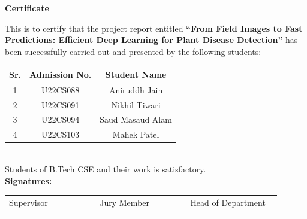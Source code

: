 \documentclass[12pt, a4paper]{report}
\begin{document}
\newpage
\thispagestyle{empty}

\begin{center}
    \vspace*{1in} %
    
    {\LARGE \textbf{Certificate}} \\[1.2cm]

    \begin{minipage}{0.9\textwidth}
        \normalsize
        This is to certify that the project report entitled \textbf{\normalsize ``From Field Images to Fast Predictions: Efficient Deep Learning for Plant Disease Detection''} has been successfully carried out and presented by the following students: \\[0.8cm]

        \renewcommand{\arraystretch}{1.2}
        \begin{tabular}{|c|c|c|}
            \hline
            \textbf{Sr.} & \textbf{Admission No.} & \textbf{Student Name} \\
            \hline
            1 & U22CS088 & Aniruddh Jain \\
            \hline
            2 & U22CS091 & Nikhil Tiwari \\
            \hline
            3 & U22CS094 & Saud Masaud Alam \\
            \hline
            4 & U22CS103 & Mahek Patel \\
            \hline
        \end{tabular} \\[0.8cm]

        Students of B.Tech CSE and their work is satisfactory. \\[1.0cm]

        \textbf{Signatures:} \\[1.0cm]

        \begin{tabular}{p{0.3\linewidth} p{0.3\linewidth} p{0.3\linewidth}}
            \centering Supervisor & \centering Jury Member & \centering Head of Department \\
            \vspace{2cm} & \vspace{2cm} & \vspace{2cm} \\ %
        \end{tabular}
    \end{minipage}
\end{center}
\end{document}
